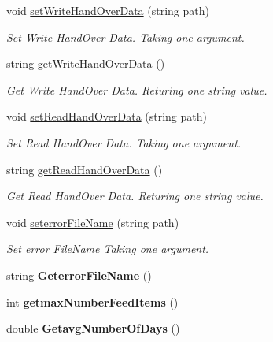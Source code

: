 \begin{DoxyCompactItemize}
void \mbox{\hyperlink{class_global_vars_aa0e41152bee501f128dc362540652326}{set\+Write\+Hand\+Over\+Data}} (string path)
\begin{DoxyCompactList}\small\item\em Set Write Hand\+Over Data. Taking one argument. \end{DoxyCompactList}\item 
string \mbox{\hyperlink{class_global_vars_aba6cb8dacca6e4db1f77c504027e38a7}{get\+Write\+Hand\+Over\+Data}} ()
\begin{DoxyCompactList}\small\item\em Get Write Hand\+Over Data. Returing one string value. \end{DoxyCompactList}\item 
void \mbox{\hyperlink{class_global_vars_a3d2a46ab9111e91ec5d7108f3b6bb949}{set\+Read\+Hand\+Over\+Data}} (string path)
\begin{DoxyCompactList}\small\item\em Set Read Hand\+Over Data. Taking one argument. \end{DoxyCompactList}\item 
string \mbox{\hyperlink{class_global_vars_a0989d5988f75ed2be0993c16cb3397be}{get\+Read\+Hand\+Over\+Data}} ()
\begin{DoxyCompactList}\small\item\em Get Read Hand\+Over Data. Returing one string value. \end{DoxyCompactList}\item 
void \mbox{\hyperlink{class_global_vars_ace9170eba61644f40c5689d021e7ac8b}{seterror\+File\+Name}} (string path)
\begin{DoxyCompactList}\small\item\em Set error File\+Name Taking one argument. \end{DoxyCompactList}\item 
\mbox{\label{class_global_vars_a513057b3afb410a82e48170fde7f19aa}} 
string {\bfseries Geterror\+File\+Name} ()
\item 
\mbox{\label{class_global_vars_a76458db4b5f2b97dd8fe01f2a5a73f87}} 
int {\bfseries getmax\+Number\+Feed\+Items} ()
\item 
\mbox{\label{class_global_vars_a1d152c67721fc4d265fd737adcbac6db}} 
double {\bfseries Getavg\+Number\+Of\+Days} ()
\item 

\end{DoxyCompactItemize}
